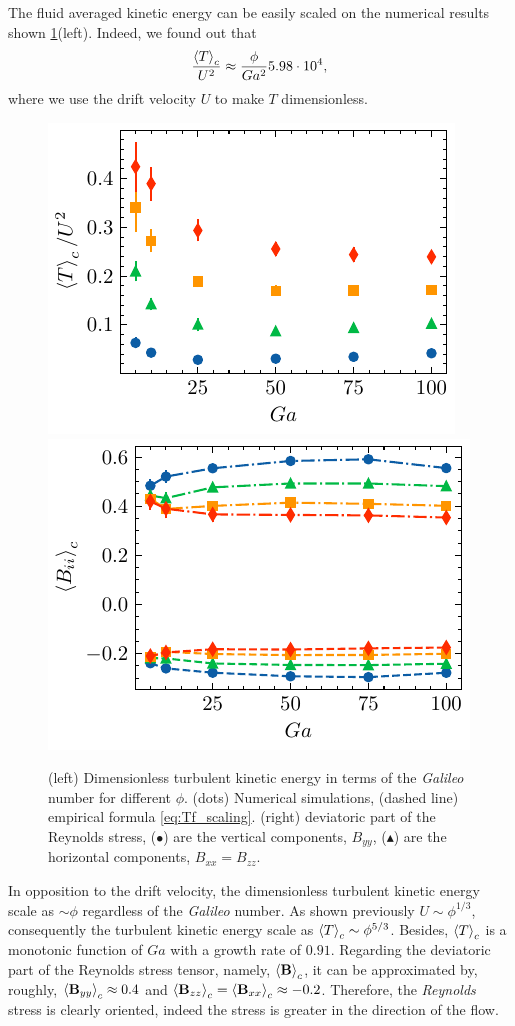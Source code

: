 The fluid averaged kinetic energy can be easily scaled on the numerical results shown \ref{fig:Tf_Bf}(left).
Indeed, we found out that 
\begin{equation}
    \frac{\left<T\right>_c}{U^2} \approx \frac{\phi}{Ga^2}5.98\cdot10^{4} ,
    \label{eq:Tf_scaling}
\end{equation}
where we use the drift velocity $U$ to make $T$ dimensionless. 
\begin{figure}[h!]
    \centering
    \includegraphics[height=0.3\textwidth]{image/HOMOGENEOUS/fCA/Tf.pdf}
    \includegraphics[height=0.3\textwidth]{image/HOMOGENEOUS/fCA/Bf.pdf}
    \caption{(left) Dimensionless turbulent kinetic energy in terms of the \textit{Galileo} number for different $\phi$. (dots) Numerical simulations, (dashed line) empirical formula \ref{eq:Tf_scaling}.
    (right) deviatoric part of the Reynolds stress, ($\bullet$) are the vertical components, $B_{yy}$, ($\blacktriangle$) are the horizontal components, $B_{xx} = B_{zz}$.}
    \label{fig:Tf_Bf}
\end{figure}
In opposition to the drift velocity, the dimensionless turbulent kinetic energy scale as $\sim \phi$ regardless of the \textit{Galileo} number. 
As shown previously $U \sim \phi^{1/3}$, consequently the turbulent kinetic energy scale as $\left<T\right>_c \sim \phi^{5/3}$. 
Besides, $\left<T\right>_c$ is a monotonic function of $Ga$ with a growth rate of $0.91$. 
Regarding the deviatoric part of the Reynolds stress tensor, namely, $\left<\textbf{B}\right>_c$, it can be approximated by, roughly, $\left<\textbf{B}_{yy}\right>_c \approx 0.4$ and $\left<\textbf{B}_{zz}\right>_c = \left<\textbf{B}_{xx}\right>_c  \approx - 0.2$.
Therefore, the \textit{Reynolds} stress is clearly oriented, indeed the stress is greater in the direction of the flow. 
